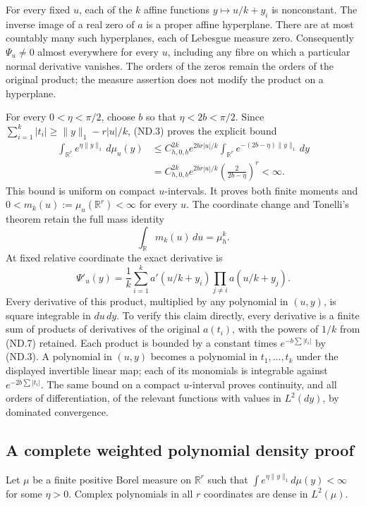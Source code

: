 For every fixed \(u\), each of the \(k\) affine functions
\(y\mapsto u/k+y_i\) is nonconstant. The inverse image of a
real zero of \(a\) is a proper affine hyperplane. There are at
most countably many such hyperplanes, each of Lebesgue measure zero.
Consequently \(\Psi_u\ne0\) almost everywhere for every \(u\),
including any fibre on which a particular normal derivative vanishes.
The orders of the zeros remain the orders of the original product;
the measure assertion does not modify the product on a hyperplane.

For every \(0<\eta<\pi/2\), choose \(b\) so that
\(\eta<2b<\pi/2\). Since
\(\sum_{i=1}^k|t_i|\ge\|y\|_1-r|u|/k\), (ND.3) proves
the explicit bound
\[
 \begin{aligned}
 \int_{\mathbb R^r}e^{\eta\|y\|_1}\,d\mu_u(y)
 &\le C_{h,0,b}^{2k}e^{2br|u|/k}
       \int_{\mathbb R^r}e^{-(2b-\eta)\|y\|_1}\,dy\\
 &=C_{h,0,b}^{2k}e^{2br|u|/k}
       \left(\frac{2}{2b-\eta}\right)^r<\infty.
 \end{aligned}
 \tag{ND.8}
\]
This bound is uniform on compact \(u\)-intervals. It proves both
finite moments and \(0<m_k(u):=\mu_u(\mathbb R^r)<\infty\)
for every \(u\). The coordinate change and Tonelli's theorem retain
the full mass identity
\[
 \int_{\mathbb R}m_k(u)\,du=\mu_h^k.
 \tag{ND.9}
\]
At fixed relative coordinate the exact derivative is
\[
 \Psi'_u(y)=\frac1k\sum_{i=1}^k a'(u/k+y_i)
                         \prod_{j\ne i}a(u/k+y_j).
 \tag{ND.10}
\]
Every derivative of this product, multiplied by any polynomial in
\((u,y)\), is square integrable in \(du\,dy\). To verify this
claim directly, every derivative is a finite sum of products of
derivatives of the original \(a(t_i)\), with the powers of \(1/k\)
from (ND.7) retained. Each product is bounded by a constant times
\(e^{-b\sum|t_i|}\) by (ND.3). A polynomial in \((u,y)\)
becomes a polynomial in \(t_1,\ldots,t_k\) under the displayed
invertible linear map; each of its monomials is integrable against
\(e^{-2b\sum|t_i|}\). The same bound on a compact \(u\)-interval
proves continuity, and all orders of differentiation, of the relevant
functions with values in \(L^2(dy)\), by dominated convergence.

\subsection{A complete weighted polynomial density proof}

\begin{theorem}
Let \(\mu\) be a finite positive Borel measure on \(\mathbb R^r\)
such that \(\int e^{\eta\|y\|_1}d\mu(y)<\infty\) for some
\(\eta>0\). Complex polynomials in all \(r\) coordinates are
dense in \(L^2(\mu)\).
\end{theorem}

